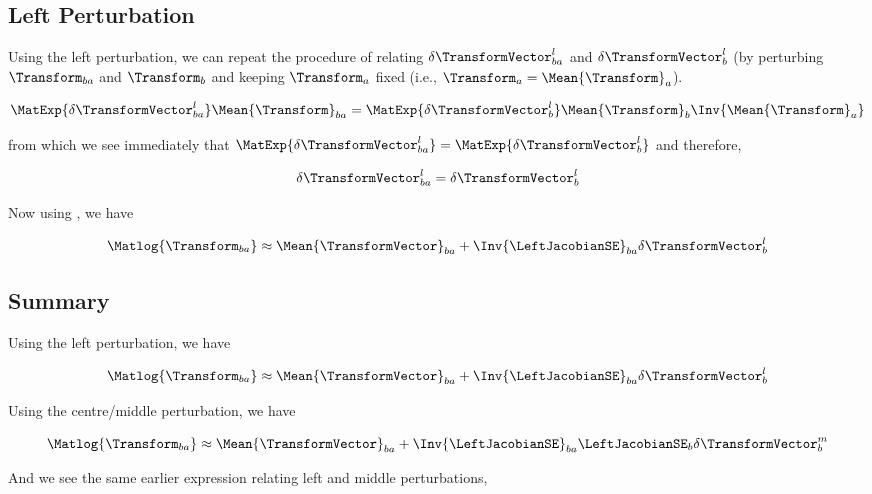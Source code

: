 \subsection{Left Perturbation}

Using the left perturbation, we can repeat the procedure of relating $\delta \TransformVector_{ba}^l$ and $\delta \TransformVector_{b}^l$ (by perturbing $\Transform_{ba}$ and $\Transform_{b}$ and keeping $\Transform_{a}$ fixed (i.e., $\Transform_{a} = \Mean{\Transform}_{a}$).

\begin{equation}
	\MatExp{\delta \TransformVector_{ba}^l} \Mean{\Transform}_{ba} = \MatExp{\delta \TransformVector_{b}^l} \Mean{\Transform}_{b} \Inv{\Mean{\Transform}_{a}}
\end{equation}

\noindent from which we see immediately that $\MatExp{\delta \TransformVector_{ba}^l} = \MatExp{\delta \TransformVector_{b}^l}$ and therefore,

\begin{equation}
	\delta \TransformVector_{ba}^l = \delta \TransformVector_{b}^l
\end{equation}

\noindent Now using , we have

\begin{equation}
	\Matlog{\Transform_{ba}} \approx \Mean{\TransformVector}_{ba}
 + \Inv{\LeftJacobianSE}_{ba} \delta \TransformVector_{b}^l
\end{equation}

\subsection{Summary}

Using the left perturbation, we have

\begin{equation}
	\Matlog{\Transform_{ba}} \approx \Mean{\TransformVector}_{ba}
 + \Inv{\LeftJacobianSE}_{ba} \delta \TransformVector_{b}^l
\end{equation}

\noindent Using the centre/middle perturbation, we have

\begin{equation}
	\Matlog{\Transform_{ba}} \approx \Mean{\TransformVector}_{ba} + \Inv{\LeftJacobianSE}_{ba} \LeftJacobianSE_{b} \delta \TransformVector_{b}^m
\end{equation}

\noindent And we see the same earlier expression relating left and middle perturbations,

